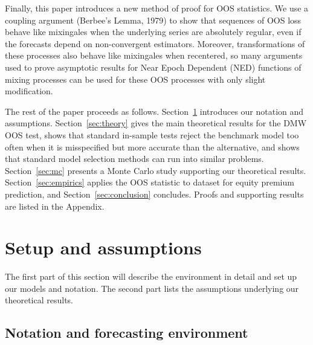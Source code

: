 \documentclass[12pt]{article}
\begin{document}
Finally, this paper introduces a new method of proof for OOS
statistics.  We use a coupling argument (Berbee's Lemma, 1979) to show
that sequences of OOS loss behave like mixingales when the
underlying series are absolutely regular, even if the forecasts depend
on non-convergent estimators.  Moreover, transformations of these
processes also behave like mixingales when recentered, so 
many arguments used to prove asymptotic
results for Near Epoch Dependent (NED) functions of mixing processes
can be used for these OOS processes with only slight modification.

The rest of the paper proceeds as follows.
Section~\ref{sec:assumptions} introduces our notation and assumptions.
Section~\ref{sec:theory} gives the main theoretical results for the
DMW OOS test, shows that standard in-sample tests reject the
benchmark model too often when it is misspecified but more accurate than the
alternative, and shows that standard model selection methods can run
into similar problems. Section~\ref{sec:mc}
presents a Monte Carlo study supporting our theoretical results.
Section~\ref{sec:empirics} applies the OOS statistic to
 dataset for equity premium prediction, and
Section~\ref{sec:conclusion} concludes.  Proofs and supporting results
are listed in the Appendix.

\section{Setup and assumptions}
\label{sec:assumptions}

The first part of this section will describe the environment in detail
and set up our models and notation. The second part lists the
assumptions underlying our theoretical results.

\subsection{Notation and forecasting environment}
\end{document}
